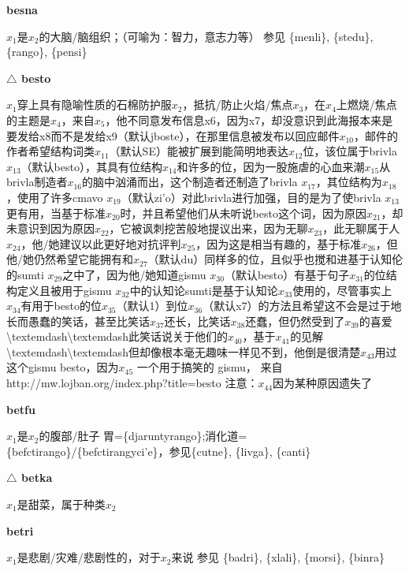 \documentclass[notitlepage,twocolumn,a4paper,10pt]{book}
\begin{document}
{\sffamily\bfseries besna}\enspace {\ttfamily\bfseries[ben]}  $x_1$是$x_2$的大脑\slash{}脑组织；（可喻为：智力，意志力等） \textemdash{} 参见 \{menli\}, \{stedu\}, \{rango\}, \{pensi\}

{\sffamily\bfseries $\triangle$ besto} $x_1$穿上具有隐喻性质的石棉防护服$x_2$，抵抗\slash{}防止火焰\slash{}焦点$x_3$，在$x_4$上燃烧\slash{}焦点的主题是$x_4$，来自$x_5$，他不同意发布信息x6，因为x7，却没意识到此海报本来是要发给x8而不是发给x9（默认jboste），在那里信息被发布以回应邮件$x_10$，邮件的作者希望结构词类$x_11$（默认SE）能被扩展到能简明地表达$x_12$位，该位属于brivla $x_13$（默认besto），其具有位结构$x_14$和许多的位，因为一股施虐的心血来潮$x_15$从brivla制造者$x_16$的脑中汹涌而出，这个制造者还制造了brivla $x_17$，其位结构为$x_18$，使用了许多cmavo $x_19$（默认zi'o）对此brivla进行加强，目的是为了使brivla $x_13$更有用，当基于标准$x_20$时，并且希望他们从未听说besto这个词，因为原因$x_21$，却未意识到因为原因$x_22$，它被讽刺挖苦般地提议出来，因为无聊$x_23$，此无聊属于人$x_24$，他\slash{}她建议以此更好地对抗评判$x_25$，因为这是相当有趣的，基于标准$x_26$，但他\slash{}她仍然希望它能拥有和$x_27$（默认du）同样多的位，且似乎也搅和进基于认知伦的sumti $x_29$之中了，因为他\slash{}她知道gismu $x_30$（默认besto）有基于句子$x_31$的位结构定义且被用于gismu $x_32$中的认知论sumti是基于认知论$x_33$使用的，尽管事实上$x_34$有用于besto的位$x_35$（默认1）到位$x_36$（默认x7）的方法且希望这不会是过于地长而愚蠢的笑话，甚至比笑话$x_37$还长，比笑话$x_38$还蠢，但仍然受到了$x_39$的喜爱\textbackslash{}textemdash{}\textbackslash{}textemdash{}此笑话说关于他们的$x_40$，基于$x_41$的见解\textbackslash{}textemdash{}\textbackslash{}textemdash{}但却像根本毫无趣味一样见不到，他倒是很清楚$x_43$用过这个gismu besto，因为$x_45$ \textemdash{} 一个用于搞笑的 gismu， 来自 http:\slash{}\slash{}mw.lojban.org\slash{}index.php?title=besto 注意：$x_44$因为某种原因遗失了

{\sffamily\bfseries betfu}\enspace {\ttfamily\bfseries[bef     be'u]}  $x_1$是$x_2$的腹部\slash{}肚子 \textemdash{} 胃=\{djaruntyrango\};消化道=\{befctirango\}\slash{}\{befctirangyci'e\}，参见\{cutne\}, \{livga\}, \{canti\}

{\sffamily\bfseries $\triangle$ betka} $x_1$是甜菜，属于种类$x_2$

{\sffamily\bfseries betri}\enspace {\ttfamily\bfseries[bet]}  $x_1$是悲剧\slash{}灾难\slash{}悲剧性的，对于$x_2$来说 \textemdash{} 参见 \{badri\}, \{xlali\}, \{morsi\}, \{binra\}
\end{document}
